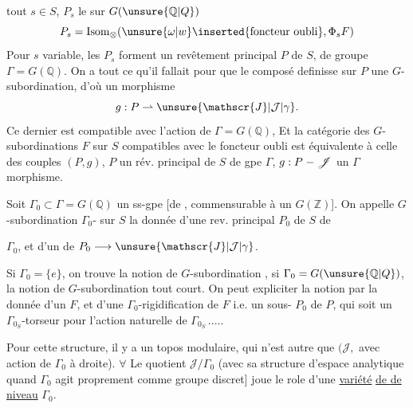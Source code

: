 tout $s\in S$, $P_s$ le  sur $G(\unsure{\mathbb{Q}|Q})$
\[
 P_s=\operatorname{Isom}_{\otimes}(\unsure{\omega|w}\inserted{\text{foncteur oubli}},\Phi_sF)
\]
Pour $s$ variable, les $P_s$ forment un revêtement principal  $P$ de $S$, de groupe $\Gamma=G(\mathbb{Q})$. On a tout ce qu'il fallait pour que le \unsure{$\otimes$} composé
 definisse sur $P$ une $G$-subordination, d'où un morphisme
\[
 g:P\rightharpoonup\unsure{\mathscr{J}|\mathcal{J}|\gamma}.
\]
 Ce dernier est compatible avec l'action de $\Gamma=G(\mathbb{Q})$,  Et la catégorie des  $G$-subordinations $F$ sur $S$ compatibles avec le foncteur oubli est équivalente à celle des couples $(P,g)$, $P$ un rév. principal de $S$ de gpe $\Gamma$, $g:P\relbar\mathscr{J}$ un $\Gamma$ morphisme.

Soit $\Gamma_0\subset\Gamma=G(\mathbb{Q})$ un ss-gpe [de , commensurable à un $G(\mathbb{Z})$]. On appelle $G$-subordination $\Gamma_0$- sur $S$ la donnée d'une rev. principal $P_0$ de $S$ de


 $\Gamma_0$, et d'un  de $P_0\longrightarrow\unsure{\mathscr{J}|\mathcal{J}|\gamma}$.

Si $\Gamma_0=\{e\}$, on trouve la notion de $G$-subordination , si $\Gamma_0=G(\unsure{\mathbb{Q}|Q})$, la notion de $G$-subordination tout court. On peut expliciter la notion par la donnée d'un $F$, et d'une  $\Gamma_0$-rigidification de $F$ i.e. un sous- $P_0$ de $P$, qui soit un  $\Gamma_{0_S}$-torseur pour l'action naturelle de $\Gamma_{0_S}$\,.....

Pour cette structure, il y a un topos modulaire, qui n'est autre que  $(\mathscr{J},$ avec action de $\Gamma_0$ à droite). $\forall$ Le quotient $\mathscr{J}/\Gamma_0$ (avec sa structure d'espace analytique quand $\Gamma_0$ agit proprement comme groupe discret]  joue le role d'une \uline{variété} \uline{de } \uline{de niveau} $\Gamma_0$.


